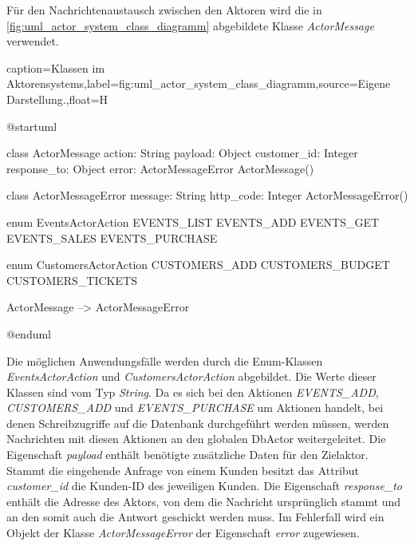Für den Nachrichtenaustausch zwischen den Aktoren wird die in \autoref{fig:uml_actor_system_class_diagramm} abgebildete Klasse \textit{ActorMessage} verwendet.

\begin{dhbwfigure}{caption=Klassen im Aktorensystems,label=fig:uml_actor_system_class_diagramm,source={Eigene Darstellung.},float=H}
    \begin{plantuml}
        @startuml

        class ActorMessage {
            action: String
            payload: Object 
            customer_id: Integer
            response_to: Object
            error: ActorMessageError
            ActorMessage()
        }

        class ActorMessageError {
            message: String
            http_code: Integer 
            ActorMessageError()
        }

        enum EventsActorAction {
            EVENTS_LIST
            EVENTS_ADD
            EVENTS_GET
            EVENTS_SALES
            EVENTS_PURCHASE
        }

        enum CustomersActorAction {
            CUSTOMERS_ADD
            CUSTOMERS_BUDGET
            CUSTOMERS_TICKETS
        }

        ActorMessage --> ActorMessageError

        @enduml
    \end{plantuml}
\end{dhbwfigure}\unskip

Die möglichen Anwendungsfälle werden durch die Enum-Klassen \textit{EventsActorAction} und \textit{CustomersActorAction} abgebildet.
Die Werte dieser Klassen sind vom Typ \textit{String}.
Da es sich bei den Aktionen \textit{EVENTS\_ADD}, \textit{CUSTOMERS\_ADD} und \textit{EVENTS\allowbreak \_PURCHASE} um Aktionen handelt, bei denen Schreibzugriffe auf die Datenbank durchgeführt werden müssen, werden Nachrichten mit diesen Aktionen an den globalen DbActor weitergeleitet.
Die Eigenschaft \textit{payload} enthält benötigte zusätzliche Daten für den Zielaktor.
Stammt die eingehende Anfrage von einem Kunden besitzt das Attribut \textit{customer\_id} die Kunden-ID des jeweiligen Kunden.
Die Eigenschaft \textit{response\_to} enthält die Adresse des Aktors, von dem die Nachricht ursprünglich stammt und an den somit auch die Antwort geschickt werden muss.
Im Fehlerfall wird ein Objekt der Klasse \textit{ActorMessageError} der Eigenschaft \textit{error} zugewiesen.
